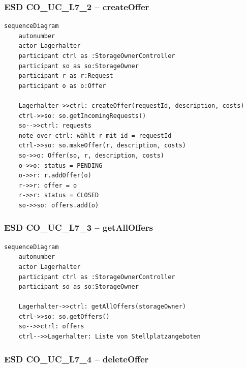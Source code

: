 \subsubsection*{ESD CO\_UC\_L7\_2 – createOffer}

\begin{lstlisting}[basicstyle=\ttfamily\small, breaklines=true]
sequenceDiagram
    autonumber
    actor Lagerhalter
    participant ctrl as :StorageOwnerController
    participant so as so:StorageOwner
    participant r as r:Request
    participant o as o:Offer

    Lagerhalter->>ctrl: createOffer(requestId, description, costs)
    ctrl->>so: so.getIncomingRequests()
    so-->>ctrl: requests
    note over ctrl: wählt r mit id = requestId
    ctrl->>so: so.makeOffer(r, description, costs)
    so->>o: Offer(so, r, description, costs)
    o->>o: status = PENDING
    o->>r: r.addOffer(o)
    r->>r: offer = o
    r->>r: status = CLOSED
    so->>so: offers.add(o)
\end{lstlisting}

\newpage

{}
\subsubsection*{ESD CO\_UC\_L7\_3 – getAllOffers}

\begin{lstlisting}[basicstyle=\ttfamily\small, breaklines=true]
sequenceDiagram
    autonumber
    actor Lagerhalter
    participant ctrl as :StorageOwnerController
    participant so as so:StorageOwner

    Lagerhalter->>ctrl: getAllOffers(storageOwner)
    ctrl->>so: so.getOffers()
    so-->>ctrl: offers
    ctrl-->>Lagerhalter: Liste von Stellplatzangeboten
\end{lstlisting}

\newpage

{}
\subsubsection*{ESD CO\_UC\_L7\_4 – deleteOffer}

